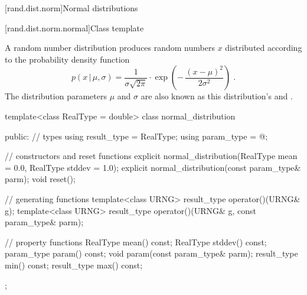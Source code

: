
[rand.dist.norm]{Normal distributions}%
%


[rand.dist.norm.normal]{Class template }%
%

\pnum
A  random number distribution
produces random numbers $x$
distributed according to
the probability density function%
%
\[%
 p(x\,|\,\mu,\sigma)
      = \frac{1}{\sigma \sqrt{2\pi}}
        \cdot
        \exp{\left(- \, \frac{(x - \mu)^2}
                             {2 \sigma^2}
             \right)
            }
\; \mbox{.}
\]
The distribution parameters $\mu$ and $\sigma$
are also known as this distribution's %
%
and %
%
%
.

\begin{codeblock}
template<class RealType = double>
 class normal_distribution
{
public:
 // types
 using result_type = RealType;
 using param_type  = @\unspec@;

 // constructors and reset functions
 explicit normal_distribution(RealType mean = 0.0, RealType stddev = 1.0);
 explicit normal_distribution(const param_type& parm);
 void reset();

 // generating functions
 template<class URNG>
   result_type operator()(URNG& g);
 template<class URNG>
   result_type operator()(URNG& g, const param_type& parm);

 // property functions
 RealType mean() const;
 RealType stddev() const;
 param_type param() const;
 void param(const param_type& parm);
 result_type min() const;
 result_type max() const;
};
\end{codeblock}


